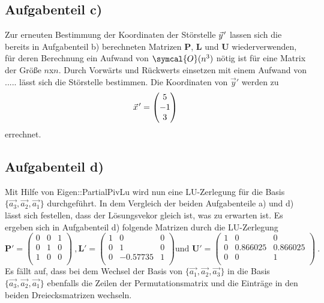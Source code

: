 \subsection*{Aufgabenteil c)}
Zur erneuten Bestimmung der Koordinaten der Störstelle $\pvec{y}'$ lassen sich die bereits
in Aufgabenteil b) berechneten Matrizen $\symbf{P}$, $\symbf{L}$ und $\symbf{U}$ wiederverwenden, für deren Berechnung ein Aufwand von $\symcal{O}(n^3)$ nötig ist für eine Matrix der Größe $n$x$n$.
Durch Vorwärts und Rückwerts einsetzen mit einem Aufwand von ..... %
lässt sich die Störstelle bestimmen.
Die Koordinaten von $\vec{y}'$ werden zu
\begin{equation*}
  \pvec{x}'=
  \begin{pmatrix}
    5 \\
    -1 \\
    3 \\
  \end{pmatrix} \\
\end{equation*}
errechnet.


\subsection*{Aufgabenteil d)}
Mit Hilfe von Eigen::PartialPivLu wird nun eine LU-Zerlegung für die Basis $\{\vec{a_3},\vec{a_2},\vec{a_1}\}$ durchgeführt. In dem Vergleich der beiden Aufgabenteile a) und d) lässt sich festellen, dass der Lösungsvekor gleich ist, was zu erwarten ist.
Es ergeben sich in Aufgabenteil d) folgende Matrizen durch die LU-Zerlegung
\begin{equation*}
  \symbf{P'}=
  \begin{pmatrix}
    0 & 0 & 1 \\
    0 & 1 & 0 \\
    1 & 0 & 0 \\
  \end{pmatrix} \: ,
  \symbf{L'}=
  \begin{pmatrix}
    1 & 0 & 0 \\
    0 & 1 & 0 \\
    0 & -0.57735 & 1 \\
  \end{pmatrix}
  \text{und }
  \symbf{U'}=
  \begin{pmatrix}
    1 & 0 & 0 \\
    0 & 0.866025 & 0.866025 \\
    0 & 0 & 1 \\
  \end{pmatrix} \: .
\end{equation*}
Es fällt auf, dass bei dem Wechsel der Basis von $\{\vec{a_1},\vec{a_2},\vec{a_3}\}$ in die Basis $\{\vec{a_3},\vec{a_2},\vec{a_1}\}$ ebenfalls die Zeilen der Permutationsmatrix und die Einträge in den beiden Dreiecksmatrizen wechseln.

